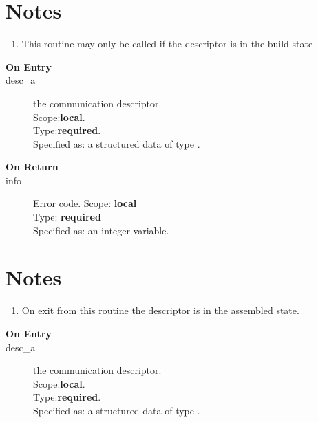 \section*{Notes}
\begin{enumerate}
\item This routine may only be called if the descriptor is in the
  build state
\end{enumerate}



%
%


\begin{description}
\item[\bf On Entry]
\item[desc\_a] the communication descriptor.\\
Scope:{\bf local}.\\
Type:{\bf required}.\\
Specified as: a structured data of type \descdata.
\end{description}

\begin{description}
\item[\bf On Return]
\item[info] Error code.
Scope: {\bf local} \\
Type: {\bf required}\\
Specified as: an integer variable.
\end{description}
\section*{Notes}
\begin{enumerate}
\item On exit from this routine the descriptor is in the assembled
  state. 
\end{enumerate}



%
%


\begin{description}
\item[\bf On Entry]
\item[desc\_a] the communication descriptor.\\
Scope:{\bf local}.\\
Type:{\bf required}.\\
Specified as: a structured data of type \descdata.

\end{description}

